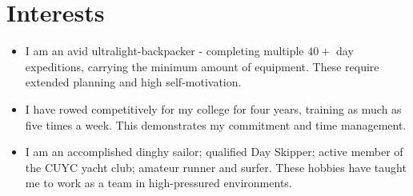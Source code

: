 \documentclass[11pt]{article}
\begin{document}
\pagebreak

\section*{Interests}

\begin{itemize}[leftmargin=*]
    \setlength{\itemsep}{0pt}
    \item I am an avid ultralight-backpacker - completing multiple $40+$ day expeditions, carrying the minimum amount of equipment. These require extended planning and high self-motivation.
          
    \item I have rowed competitively for my college for four years, training as much as five times a week. This demonstrates my commitment and time management.
          
    \item I am an accomplished dinghy sailor; qualified Day Skipper; active member of the CUYC yacht club; amateur runner and surfer. These hobbies have taught me to work as a team in high-pressured environments.
\end{itemize}




\end{document}
